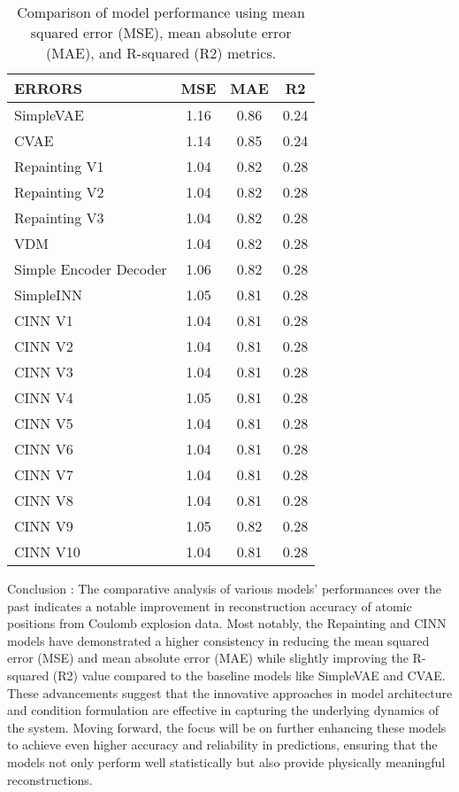 \documentclass{article}
\begin{document}
\begin{itemize}
\begin{table}[h]
\centering
\begin{tabular}{|l|c|c|c|}
\hline
ERRORS & MSE & MAE & R2 \\
\hline
SimpleVAE & 1.16 & 0.86 & 0.24 \\
CVAE & 1.14 & 0.85 & 0.24 \\
Repainting V1 & 1.04 & 0.82 & 0.28 \\
Repainting V2 & 1.04 & 0.82 & 0.28 \\
Repainting V3 & 1.04 & 0.82 & 0.28 \\
VDM & 1.04 & 0.82 & 0.28 \\
Simple Encoder Decoder & 1.06 & 0.82 & 0.28 \\
SimpleINN & 1.05 & 0.81 & 0.28 \\
CINN V1 & 1.04 & 0.81 & 0.28 \\
CINN V2 & 1.04 & 0.81 & 0.28 \\
CINN V3 & 1.04 & 0.81 & 0.28 \\
CINN V4 & 1.05 & 0.81 & 0.28 \\
CINN V5 & 1.04 & 0.81 & 0.28 \\
CINN V6 & 1.04 & 0.81 & 0.28 \\
CINN V7 & 1.04 & 0.81 & 0.28 \\
CINN V8 & 1.04 & 0.81 & 0.28 \\
CINN V9 & 1.05 & 0.82 & 0.28 \\
CINN V10 & 1.04 & 0.81 & 0.28 \\
\hline
\end{tabular}
\caption{Comparison of model performance using mean squared error (MSE), mean absolute error (MAE), and R-squared (R2) metrics.}
\label{tab:model-comparison}
\end{table}
\vspace{1em}
\footnotesize Conclusion :
The comparative analysis of various models' performances over the past indicates a notable improvement in reconstruction accuracy of atomic positions from Coulomb explosion data. Most notably, the Repainting and CINN models have demonstrated a higher consistency in reducing the mean squared error (MSE) and mean absolute error (MAE) while slightly improving the R-squared (R2) value compared to the baseline models like SimpleVAE and CVAE. These advancements suggest that the innovative approaches in model architecture and condition formulation are effective in capturing the underlying dynamics of the system. Moving forward, the focus will be on further enhancing these models to achieve even higher accuracy and reliability in predictions, ensuring that the models not only perform well statistically but also provide physically meaningful reconstructions.

\end{itemize}
\end{document}

